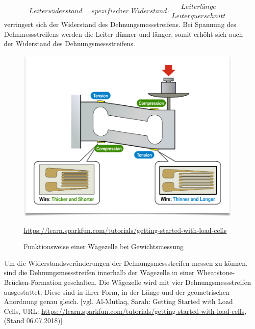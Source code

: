 \begin{equation}
    Leiterwiderstand=\textit{spezifischer Widerstand} \cdot \frac{\textit{Leiterlänge}}{Leiterquerschnitt}
\end{equation}
verringert sich der Widerstand des Dehnungsmessstreifens. Bei Spannung des Dehnmessstreifens werden die Leiter dünner und länger, somit erhöht sich auch der Widerstand des Dehnungsmessstreifens. 
\newpage
\begin{figure}[H]
    \center
    \includegraphics[width=15cm]{Bilder/waegezelle-funktionsweise.png}\\
    \caption{Funktionsweise einer Wägezelle bei Gewichtsmessung }
    \begin{flushleft} \quelle\url{https://learn.sparkfun.com/tutorials/getting-started-with-load-cells} \end{flushleft}
\end{figure}
\noindent
Um die Widerstandsveränderungen der Dehnungsmessstreifen messen zu können, sind die Dehnungsmessstreifen innerhalb der Wägezelle in einer Wheatstone-Brücken-Formation geschalten.
Die Wägezelle wird mit vier Dehnungsmessstreifen ausgestattet. Diese sind in ihrer Form, in der Länge und der geometrischen Anordnung genau gleich. [vgl. Al-Mutlaq, Sarah: Getting Started with Load Cells, URL: \url{https://learn.sparkfun.com/tutorials/getting-started-with-load-cells}, (Stand 06.07.2018)]

\newpage

